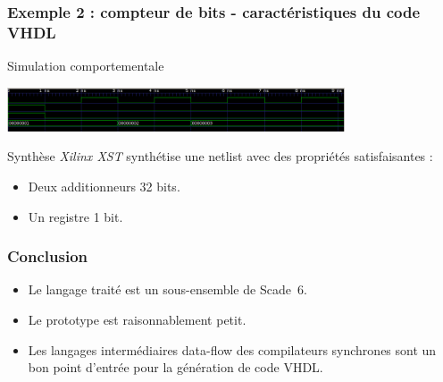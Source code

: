 \documentclass{beamer}
\newcommand{\scadesix}{{\sc Scade~6}}
\begin{document}
\begin{frame}
  \frametitle{Exemple 2 : compteur de bits - caractéristiques du code VHDL}

  \begin{block}{Simulation comportementale}
    \vspace{0.3cm}
    \begin{center}
      \includegraphics[width=10cm]{capture-chrono-bitcompteur.png}
    \end{center}
  \end{block}

  \begin{block}{Synthèse}
    \textit{Xilinx XST} synthétise une netlist avec des propriétés
    satisfaisantes :

    \begin{itemize}
    \item Deux additionneurs 32 bits.
    \item Un registre 1 bit.
    \end{itemize}
  \end{block}
\end{frame}

\begin{frame}
  \frametitle{Conclusion}

  \begin{itemize}
  \item Le langage traité est un sous-ensemble de \scadesix{}.
  \item Le prototype est raisonnablement petit.
  \item Les langages intermédiaires data-flow des compilateurs synchrones sont
    un bon point d'entrée pour la génération de code VHDL.
  \end{itemize}
\end{frame}
\end{document}
